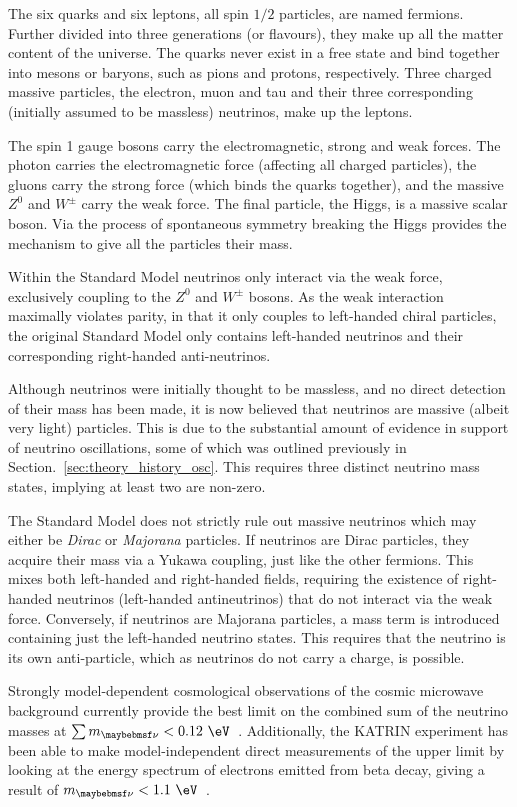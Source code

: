 The six quarks and six leptons, all spin $1/2$ particles, are named fermions. Further divided into
three generations (or flavours), they make up all the matter content of the universe. The quarks
never exist in a free state and bind together into mesons or baryons, such as pions and protons,
respectively.  Three charged massive particles, the electron, muon and tau and their three
corresponding (initially assumed to be massless) neutrinos, make up the leptons.

The spin 1 gauge bosons carry the electromagnetic, strong and weak forces. The photon carries the
electromagnetic force (affecting all charged particles), the gluons carry the strong force (which
binds the quarks together), and the massive $Z^{0}$ and $W^{\pm}$ carry the weak force. The final
particle, the Higgs, is a massive scalar boson. Via the process of spontaneous symmetry breaking
the Higgs provides the mechanism to give all the particles their mass.

Within the Standard Model neutrinos only interact via the weak force, exclusively coupling to the
$Z^{0}$ and $W^{\pm}$ bosons. As the weak interaction maximally violates parity, in that it only
couples to left-handed chiral particles, the original Standard Model only contains left-handed
neutrinos and their corresponding right-handed anti-neutrinos.

Although neutrinos were initially thought to be massless, and no direct detection of their mass
has been made, it is now believed that neutrinos are massive (albeit very light) particles. This
is due to the substantial amount of evidence in support of neutrino oscillations, some of which
was outlined previously in Section.~\ref{sec:theory_history_osc}. This requires three distinct
neutrino mass states, implying at least two are non-zero.

The Standard Model does not strictly rule out massive neutrinos which may either be \emph{Dirac}
or \emph{Majorana} particles. If neutrinos are Dirac particles, they acquire their mass via a
Yukawa coupling, just like the other fermions. This mixes both left-handed and right-handed
fields, requiring the existence of right-handed neutrinos (left-handed antineutrinos) that do not
interact via the weak force. Conversely, if neutrinos are Majorana particles, a mass term is
introduced containing just the left-handed neutrino states. This requires that the neutrino is its
own anti-particle, which as neutrinos do not carry a charge, is possible.

Strongly model-dependent cosmological observations of the cosmic microwave background currently
provide the best limit on the combined sum of the neutrino masses at $\sum m_{\nu} <
    0.12~\eV$~\cite{planck2018}. Additionally, the KATRIN experiment has been able to make
model-independent direct measurements of the upper limit by looking at the energy spectrum of
electrons emitted from beta decay, giving a result of $m_{\nu} < 1.1~\eV$~\cite{aker2019}.

